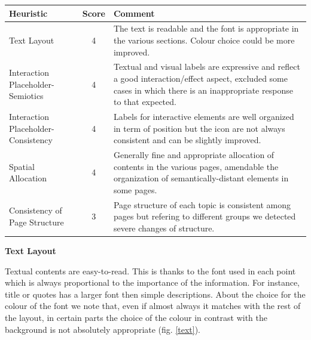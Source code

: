 \begin{table}[H]
  \begin{center}
    \label{tab:table1}
    \begin{tabular}{||l|c|p{8cm}||} %
      \textbf{Heuristic} & \textbf{Score} & \textbf{Comment}\\
      
      \hline
      Text Layout & 4 & The text is readable and the font is appropriate in the various sections. Colour choice could be more improved.\\
      \hline
      Interaction Placeholder-Semiotics & 4 & Textual and visual labels are expressive and reflect a good interaction/effect aspect, excluded some cases in which there is an inappropriate response to that expected.\\
      \hline
      Interaction Placeholder-Consistency & 4 & Labels for interactive elements are well organized in term of position but the icon are not always consistent and can be slightly improved.\\
      \hline
      Spatial Allocation & 4 & Generally fine and appropriate allocation of contents in the various pages, amendable the organization of semantically-distant elements in some pages.\\
      \hline
      Consistency of Page Structure & 3 & Page structure of each topic is consistent among pages but refering to different groups we detected severe changes of structure.\\

    \end{tabular}
  \end{center}
\end{table}
\medskip

\textbf{Text Layout}\par
Textual contents are easy-to-read. This is thanks to the font used in each point which is always proportional to the importance of the information. For instance, title or quotes has a larger font then simple descriptions. About the choice for the colour of the font we note that, even if almost always it matches with the rest of the layout, in certain parts the choice of the colour in contrast with the background is not absolutely appropriate (fig. \ref{text}).
\medskip

